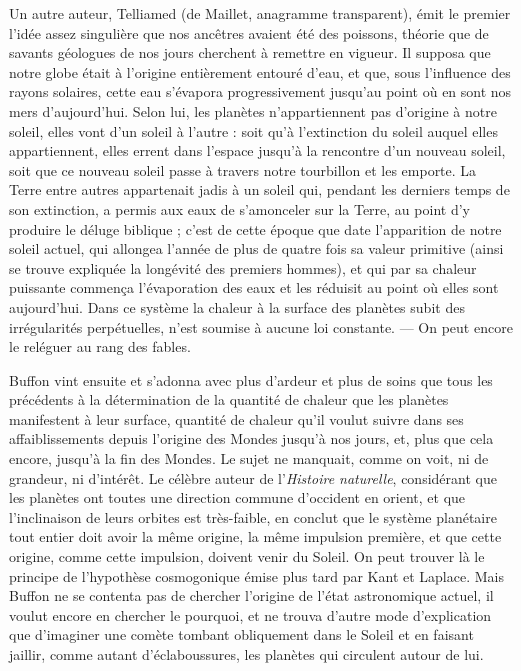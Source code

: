 \documentclass[a4paper, 11pt, oneside, landscape]{article}
\begin{document}
Un autre auteur, Telliamed (de Maillet, anagramme transparent), émit le premier l'idée assez singulière que nos ancêtres avaient été des poissons, théorie que de savants géologues de nos jours cherchent à remettre en vigueur. Il supposa que notre globe était à l'origine entièrement entouré d'eau, et que, sous l'influence des rayons solaires, cette eau s'évapora progressivement jusqu'au point où en sont nos mers d'aujourd'hui. Selon lui, les planètes n'appartiennent pas d'origine à notre soleil, elles vont d'un soleil à l'autre : soit qu'à l'extinction du soleil auquel elles appartiennent, elles errent dans l'espace jusqu'à la rencontre d'un nouveau soleil, soit que ce nouveau soleil passe à travers notre tourbillon et les emporte. La Terre entre autres appartenait jadis à un soleil qui, pendant les derniers temps de son extinction, a permis aux eaux de s'amonceler sur la Terre, au point d'y produire le déluge biblique ; c'est de cette époque que date l'apparition de notre soleil actuel, qui allongea l'année de plus de quatre fois sa valeur primitive (ainsi se trouve expliquée la longévité des premiers hommes), et qui par sa chaleur puissante commença l'évaporation des eaux et les réduisit au point où elles sont aujourd'hui. Dans ce système la chaleur à la surface des planètes subit des irrégularités perpétuelles, n'est soumise à aucune loi constante. --- On peut encore le reléguer au rang des fables.

Buffon vint ensuite et s'adonna avec plus d'ardeur et plus de soins que tous les précédents à la détermination de la quantité de chaleur que les planètes manifestent à leur surface, quantité de chaleur qu'il voulut suivre dans ses affaiblissements depuis l'origine des Mondes jusqu'à nos jours, et, plus que cela encore, jusqu'à la fin des Mondes. Le sujet ne manquait, comme on voit, ni de grandeur, ni d'intérêt. Le célèbre auteur de l'\emph{Histoire naturelle}, considérant que les planètes ont toutes une direction commune d'occident en orient, et que l'inclinaison de leurs orbites est très-faible, en conclut que le système planétaire tout entier doit avoir la même origine, la même impulsion première, et que cette origine, comme cette impulsion, doivent venir du Soleil. On peut trouver là le principe de l'hypothèse cosmogonique émise plus tard par Kant et Laplace. Mais Buffon ne se contenta pas de chercher l'origine de l'état astronomique actuel, il voulut encore en chercher le pourquoi, et ne trouva d'autre mode d'explication que d'imaginer une comète tombant obliquement dans le Soleil et en faisant jaillir, comme autant d'éclaboussures, les planètes qui circulent autour de lui.
\end{document}
